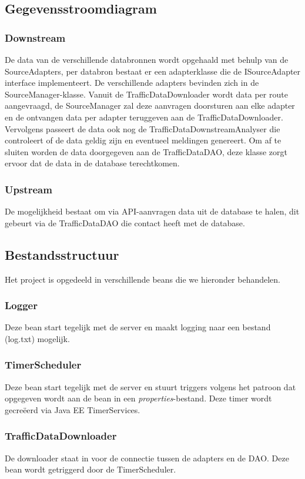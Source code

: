 \documentclass[ps,a4paper,oneside]{report}
\begin{document}
\subsection{Gegevensstroomdiagram}
\subsubsection{Downstream}
De data van de verschillende databronnen wordt opgehaald met behulp van de SourceAdapters, per databron bestaat er een adapterklasse die de ISourceAdapter interface implementeert. De verschillende adapters bevinden zich in de \\SourceManager-klasse. Vanuit de TrafficDataDownloader wordt data per route aangevraagd, de SourceManager zal deze aanvragen doorsturen aan elke adapter en de ontvangen data per adapter teruggeven aan de TrafficDataDownloader. Vervolgens passeert de data ook nog de TrafficDataDownstreamAnalyser die controleert of de data geldig zijn en eventueel meldingen genereert. Om af te sluiten worden de data doorgegeven aan de TrafficDataDAO, deze klasse zorgt ervoor dat de data in de database terechtkomen. 
\subsubsection{Upstream}
De mogelijkheid bestaat om via API-aanvragen data uit de database te halen, dit gebeurt via de TrafficDataDAO die contact heeft met de database.
\subsection{Bestandsstructuur}
Het project is opgedeeld in verschillende beans die we hieronder behandelen.
\subsubsection{Logger}
Deze bean start tegelijk met de server en maakt logging naar een bestand (log.txt) mogelijk.
\subsubsection{TimerScheduler}
Deze bean start tegelijk met de server en stuurt triggers volgens het patroon dat opgegeven wordt aan de bean in een \textit{properties}-bestand. Deze timer wordt gecre\"eerd via Java EE TimerServices.
\subsubsection{TrafficDataDownloader}
De downloader staat in voor de connectie tussen de adapters en de DAO. Deze bean wordt getriggerd door de TimerScheduler.
\end{document}
